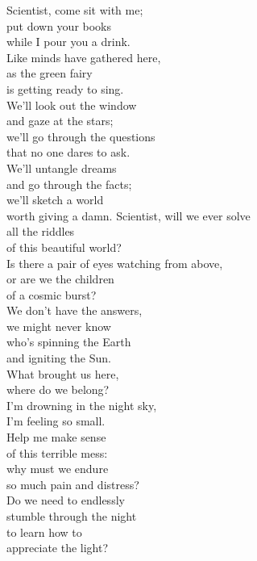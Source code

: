 
Scientist, come sit with me; \tab{}\\
put down your books \tab{}\\
while I pour you a drink. \tab{}\\
Like minds have gathered here,\tab{}\\
as the green fairy \tab{}\\
is getting ready to sing. \tab{}\\
\hop
{} We'll look out the window \\
 and gaze at the stars;\\
 we'll go through the questions\\
 that no one dares to ask.\\
 We'll untangle dreams\tab{}\\
 and go through the facts;\\
 we'll sketch a world\tab{}\\
 worth giving a damn.
\hops
Scientist, will we ever solve\\
all the riddles\\
of this beautiful world?\\
Is there a pair of eyes watching from above,\\
or are we the children\\
of a cosmic burst?\\
\hop
{} We don't have the answers,\\
 we might never know\\
 who's spinning the Earth\\
 and igniting the Sun.\\
 What brought us here,\\
 where do we belong?\\
 I'm drowning in the night sky,\\
 I'm feeling so small.\\
\hop
{} Help me make sense \\
 of this terrible mess:\\
 why must we endure\\
 so much pain and distress?\\
 Do we need to endlessly\\
 stumble through the night\\
 to learn how to\\
 appreciate the light?